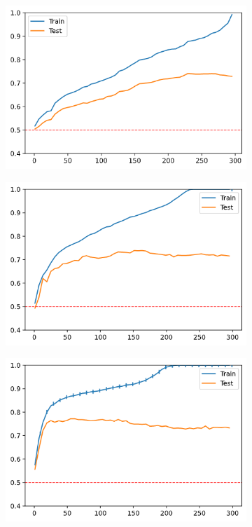 \begin{figure}[h]
    \centering
    \begin{subfigure}[b]{0.4\linewidth}
        \includegraphics[width=\linewidth]{img/ch4/vanilla300-random.png}
    \end{subfigure}
    \begin{subfigure}[b]{0.4\linewidth}
        \includegraphics[width=\linewidth]{img/ch4/vanilla300-svmrfe-s300.png}
    \end{subfigure}
    \begin{subfigure}[b]{0.4\linewidth}
        \includegraphics[width=\linewidth]{img/ch4/vanilla300-svmrfe-s10.png}

\end{subfigure}
\end{figure}
